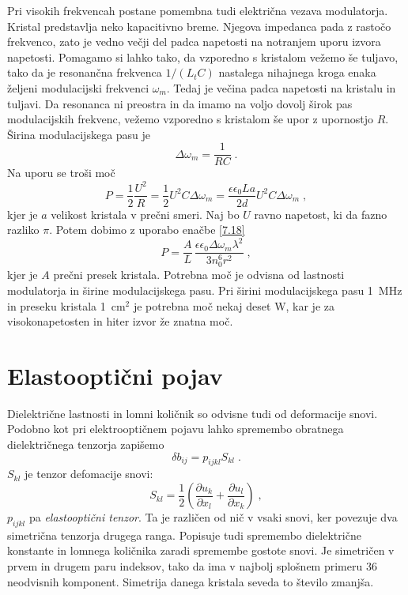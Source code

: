 Pri visokih frekvencah postane pomembna tudi električna vezava modulatorja.
Kristal predstavlja neko kapacitivno breme. Njegova impedanca pada
z rastočo frekvenco, zato je vedno večji del padca napetosti na notranjem
uporu izvora napetosti. Pomagamo si lahko tako, da vzporedno s kristalom
vežemo še tuljavo, tako da je resonančna frekvenca $1/(L_{t}C)$ nastalega
nihajnega kroga enaka željeni modulacijski frekvenci $\omega_{m}$.
Tedaj je večina padca napetosti na kristalu in tuljavi. Da resonanca
ni preostra in da imamo na voljo dovolj širok pas modulacijskih frekvenc,
vežemo vzporedno s kristalom še upor z upornostjo $R$. Širina modulacijskega
pasu je 
\begin{equation}
\Delta\omega_{m}=\frac{1}{RC}\;.\label{7.24}
\end{equation}
 Na uporu se troši moč 
\begin{equation}
P=\frac{1}{2}\frac{U^{2}}{R}=\frac{1}{2}U^{2}C\Delta\omega_{m}=\frac{\epsilon\epsilon_{0}La}{2d}U^{2}C\Delta\omega_{m}\;,\label{7.25}
\end{equation}
 kjer je $a$ velikost kristala v prečni smeri. Naj bo $U$ ravno
napetost, ki da fazno razliko $\pi$. Potem dobimo z uporabo enačbe
\ref{7.18} 
\begin{equation}
P=\frac{A}{L}\,\frac{\epsilon\epsilon_{0}\Delta\omega_{m}\lambda^{2}}{3n_{0}^{6}r^{2}}\;,\label{7.26}
\end{equation}
 kjer je $A$ prečni presek kristala. Potrebna moč je odvisna od lastnosti
modulatorja in širine modulacijskega pasu. Pri širini modulacijskega
pasu 1~MHz in preseku kristala 1~cm$^{2}$ je potrebna moč nekaj
deset W, kar je za visokonapetosten in hiter izvor že znatna moč.


\section{Elastooptični pojav}

Dielektrične lastnosti in lomni količnik so odvisne tudi od deformacije
snovi. Podobno kot pri elektrooptičnem pojavu lahko spremembo obratnega
dielektričnega tenzorja zapišemo 
\begin{equation}
\delta b_{ij}=p_{ijkl}S_{kl}\;.\label{7.27}
\end{equation}
 $S_{kl}$ je tenzor defomacije snovi: 
\begin{equation}
S_{kl}=\frac{1}{2}\left({\frac{\partial u_{k}}{\partial x_{l}}}+{\frac{\partial u_{l}}{\partial x_{k}}}\right)\;,\label{7.28}
\end{equation}
 $p_{ijkl}$ pa \textit{elastooptični tenzor}. Ta je različen od nič
v vsaki snovi, ker povezuje dva simetrična tenzorja drugega ranga.
Popisuje tudi spremembo dielektrične konstante in lomnega količnika
zaradi spremembe gostote snovi. Je simetričen v prvem in drugem paru
indeksov, tako da ima v najbolj splošnem primeru 36 neodvisnih komponent.
Simetrija danega kristala seveda to število zmanjša.

